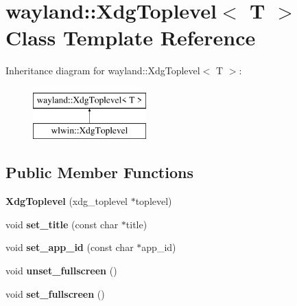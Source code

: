 \hypertarget{classwayland_1_1XdgToplevel}{}\section{wayland\+::Xdg\+Toplevel$<$ T $>$ Class Template Reference}
\label{classwayland_1_1XdgToplevel}
Inheritance diagram for wayland\+::Xdg\+Toplevel$<$ T $>$\+:\begin{figure}[H]
\begin{center}
\leavevmode
\includegraphics[height=2.000000cm]{classwayland_1_1XdgToplevel}
\end{center}
\end{figure}
\subsection*{Public Member Functions}
\begin{DoxyCompactItemize}
\item 
\mbox{\label{classwayland_1_1XdgToplevel_a7a13e882a79e0bda122e754d758d6022}} 
{\bfseries Xdg\+Toplevel} (xdg\+\_\+toplevel $\ast$toplevel)
\item 
\mbox{\label{classwayland_1_1XdgToplevel_a2f18cec00aa163d11950b7e37831885f}} 
void {\bfseries set\+\_\+title} (const char $\ast$title)
\item 
\mbox{\label{classwayland_1_1XdgToplevel_a2e694ae5d5276b39f586510af044c554}} 
void {\bfseries set\+\_\+app\+\_\+id} (const char $\ast$app\+\_\+id)
\item 
\mbox{\label{classwayland_1_1XdgToplevel_a17978249751a32e8b057676e9e4f8911}} 
void {\bfseries unset\+\_\+fullscreen} ()
\item 
\mbox{\label{classwayland_1_1XdgToplevel_a80d32dfa80a3bd0a5ef2ff6d67977529}} 
void {\bfseries set\+\_\+fullscreen} ()
\end{DoxyCompactItemize}
